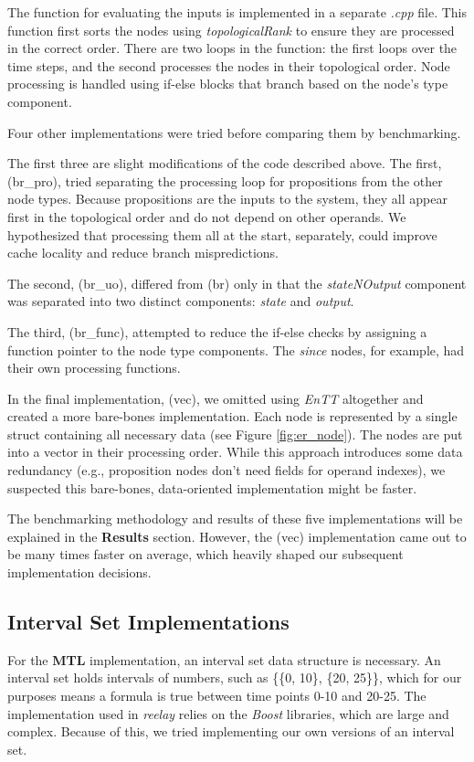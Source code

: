 \documentclass[a4paper,12pt]{report}
\begin{document}
The function for evaluating the inputs is implemented in a separate \textit{.cpp} file. This function first sorts the nodes using \textit{topologicalRank} to ensure they are processed in the correct order. There are two loops in the function: the first loops over the time steps, and the second processes the nodes in their topological order. Node processing is handled using if-else blocks that branch based on the node's type component.

Four other implementations were tried before comparing them by benchmarking.

The first three are slight modifications of the code described above. The first, (br\_pro), tried separating the processing loop for propositions from the other node types. Because propositions are the inputs to the system, they all appear first in the topological order and do not depend on other operands. We hypothesized that processing them all at the start, separately, could improve cache locality and reduce branch mispredictions.

The second, (br\_uo), differed from (br) only in that the \textit{stateNOutput} component was separated into two distinct components: \textit{state} and \textit{output}.

The third, (br\_func), attempted to reduce the if-else checks by assigning a function pointer to the node type components. The \textit{since} nodes, for example, had their own processing functions.

In the final implementation, (vec), we omitted using \textit{EnTT} altogether and created a more bare-bones implementation. Each node is represented by a single struct containing all necessary data (see Figure \ref{fig:er_node}). The nodes are put into a vector in their processing order. While this approach introduces some data redundancy (e.g., proposition nodes don't need fields for operand indexes), we suspected this bare-bones, data-oriented implementation might be faster.

The benchmarking methodology and results of these five implementations will be explained in the \textbf{Results} section. However, the (vec) implementation came out to be many times faster on average, which heavily shaped our subsequent implementation decisions.

\subsection{Interval Set Implementations} For the \textbf{MTL} implementation, an interval set data structure is necessary. An interval set holds intervals of numbers, such as \{\{0, 10\}, \{20, 25\}\}, which for our purposes means a formula is true between time points 0-10 and 20-25. The implementation used in \textit{reelay} relies on the \textit{Boost} libraries, which are large and complex. Because of this, we tried implementing our own versions of an interval set.
\end{document}
